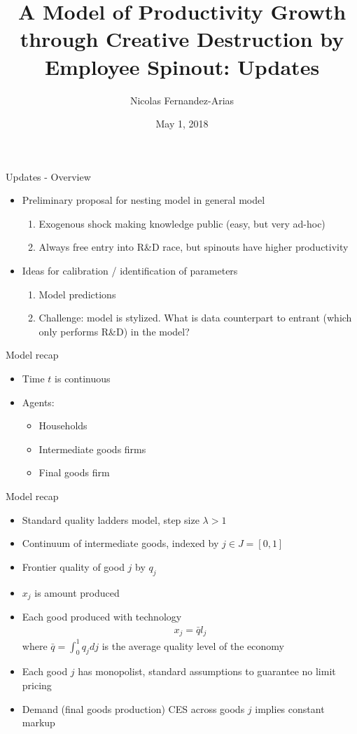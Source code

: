 \documentclass[english,usenames,dvipsnames]{beamer}
\title{A Model of Productivity Growth through Creative Destruction by Employee Spinout: Updates}
\author{Nicolas Fernandez-Arias}
\date[May 1, 2018]{May 1, 2018}
\begin{document}
	  
\frame{\titlepage}

\begin{frame}{Updates - Overview}
\begin{itemize}
	\item Preliminary proposal for nesting model in general model 
	\begin{enumerate}
		\item Exogenous shock making knowledge public (easy, but very ad-hoc)
		\item Always free entry into R\&D race, but spinouts have higher productivity 
	\end{enumerate}
	\item Ideas for calibration / identification of parameters
	\begin{enumerate}
		\item Model predictions
		\item Challenge: model is stylized. What is data counterpart to entrant (which only performs R\&D) in the model?
	\end{enumerate}
\end{itemize}
\end{frame}

\begin{frame}{Model recap}
\begin{itemize}
	\item Time $t$ is continuous 
	\item Agents:
	\begin{itemize}
		\item Households 
		\item Intermediate goods firms
		\item Final goods firm 
	\end{itemize}
\end{itemize}
\end{frame}

\begin{frame}{Model recap}
\begin{itemize}
	\item Standard quality ladders model, step size $\lambda > 1$
	\item Continuum of intermediate goods, indexed by $j\in J = [0,1]$
	\item Frontier quality of good $j$ by $q_j$
	\item $x_j$ is amount produced 
	\item Each good produced with technology
	\begin{align*}
	x_j = \bar{q} l_j
	\end{align*}
	where $\bar{q} = \int_0^1 q_j dj$ is the average quality level of the economy
	\item Each good $j$ has monopolist, standard assumptions to guarantee no limit pricing 
	\item Demand (final goods production) CES across goods $j$ implies constant markup
\end{itemize}
\end{frame}
\end{document}
